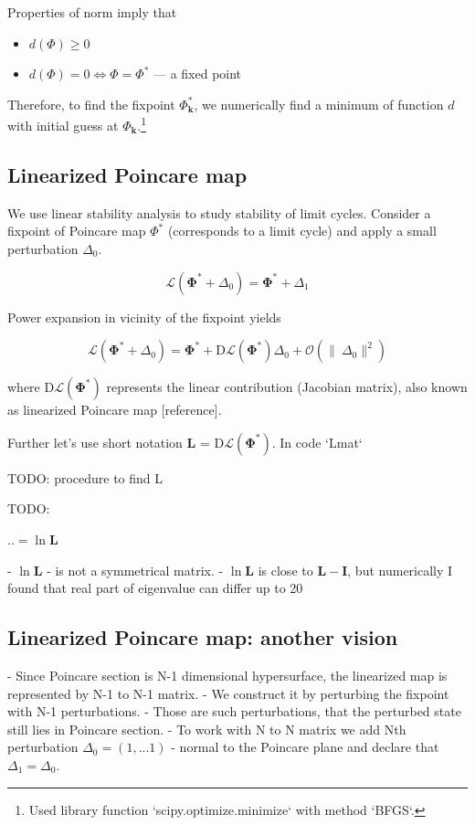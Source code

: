 \documentclass[a4paper,12pt]{article}
\renewcommand*{\vec}[1]{\mathbf{#1}}
\newcommand*{\D}{\Delta}%
\begin{document}
Properties of norm imply that
\begin{itemize}
\item $d(\Phi) \geq 0$
\item $d(\Phi)=0 \iff \Phi = \Phi^*$ --- a fixed point

\end{itemize}
Therefore, to find the fixpoint $\Phi^*_{\vec{k}}$, we numerically find a minimum of function $d$ with initial guess at $\Phi_{\vec{k}}$.\footnote{Used library function `scipy.optimize.minimize` with method `BFGS`.}


\subsection{ Linearized Poincare map}

We use linear stability analysis to study stability of limit cycles. Consider a fixpoint of Poincare map $\Phi^*$ (corresponds to a limit cycle) and apply a small perturbation $\D_0$.

$$\mathcal{L}(\mathbf{\Phi^{*}} + \D_0) = \mathbf{\Phi^{*}} + \D_1$$

Power expansion in vicinity of the fixpoint yields

$$\mathcal{L}(\mathbf{\Phi^{*}} + \D_0) = \mathbf{\Phi^{*}} +  \mathrm{D}\mathcal{L}(\mathbf{\Phi^*}) \D_0 + \mathcal{O}(\lVert\ \D_0 \rVert^2) $$

where $\mathrm{D}\mathcal{L}(\mathbf{\Phi^*})$ represents the linear contribution (Jacobian matrix), also known as linearized Poincare map [reference].

Further let's use short notation $\mathbf{L}$ = $\mathrm{D}\mathcal{L}(\mathbf{\Phi^*})$. In code `Lmat`

TODO: procedure to find L

TODO:

$.. = \ln \mathbf{L} $


- $\ln \mathbf{L}$ - is not a symmetrical matrix.
- $ \ln \mathbf{L}$ is close to $\mathbf{L} - \mathbf{I}$, but numerically I found that real part of eigenvalue can differ up to 20%

\subsection{Linearized Poincare map: another vision}

- Since Poincare section is N-1 dimensional hypersurface, the linearized map is represented by N-1 to N-1 matrix.
- We construct it by perturbing the fixpoint with N-1 perturbations.
  - Those are such perturbations, that the perturbed state still lies in Poincare section.
  - To work with N to N matrix we add Nth perturbation $\D_0 = (1,...1)$ - normal to the Poincare plane and declare that $\D_1 = \D_0$.
\end{document}
